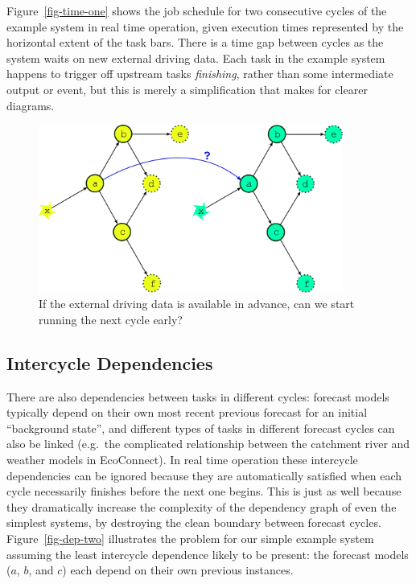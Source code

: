 \documentclass[11pt,a4paper]{article}
\begin{document}
Figure~\ref{fig-time-one} shows the job schedule for two consecutive
cycles of the example system in real time operation, given execution
times represented by the horizontal extent of the task bars. There is a
time gap between cycles as the system waits on new external driving
data.  Each task in the example system happens to trigger off upstream
tasks {\em finishing}, rather than some intermediate output or event,
but this is merely a simplification that makes for clearer diagrams.

\begin{figure} \label{fig-dep-two-linked}
    \begin{center}
        \includegraphics[width=10cm]{inkscape-svg/dep-two-cycles-linked} 
    \end{center}
    \caption{\small If the external driving data is available in
    advance, can we start running the next cycle early?} 
\end{figure}

\subsection{Intercycle Dependencies} 
\label{IntercycleDependencies}

There are also dependencies between tasks in different cycles: forecast
models typically depend on their own most recent previous forecast for
an initial ``background state'', and different types of tasks in
different forecast cycles can also be linked (e.g.\ the complicated
relationship between the catchment river and weather models in
EcoConnect). In real time operation these intercycle dependencies can be
ignored because they are automatically satisfied when each cycle
necessarily finishes before the next one begins. This is just as well
because they dramatically increase the complexity of the dependency
graph of even the simplest systems, by destroying the clean boundary
between forecast cycles. Figure~\ref{fig-dep-two} illustrates the
problem for our simple example system assuming the least intercycle
dependence likely to be present: the forecast models ($a$, $b$, and $c$)
each depend on their own previous instances.
\end{document}
